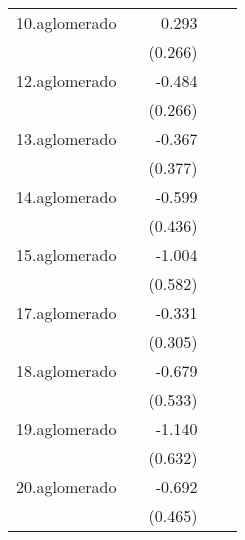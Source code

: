 {\begin{longtable}{l*{4}{D{.}{.}{-1}}}
\addlinespace
10.aglomerado&                     &       0.293         &                     &                     \\
            &                     &     (0.266)         &                     &                     \\
\addlinespace
12.aglomerado&                     &      -0.484         &                     &                     \\
            &                     &     (0.266)         &                     &                     \\
\addlinespace
13.aglomerado&                     &      -0.367         &                     &                     \\
            &                     &     (0.377)         &                     &                     \\
\addlinespace
14.aglomerado&                     &      -0.599         &                     &                     \\
            &                     &     (0.436)         &                     &                     \\
\addlinespace
15.aglomerado&                     &      -1.004         &                     &                     \\
            &                     &     (0.582)         &                     &                     \\
\addlinespace
17.aglomerado&                     &      -0.331         &                     &                     \\
            &                     &     (0.305)         &                     &                     \\
\addlinespace
18.aglomerado&                     &      -0.679         &                     &                     \\
            &                     &     (0.533)         &                     &                     \\
\addlinespace
19.aglomerado&                     &      -1.140         &                     &                     \\
            &                     &     (0.632)         &                     &                     \\
\addlinespace
20.aglomerado&                     &      -0.692         &                     &                     \\
            &                     &     (0.465)         &                     &                     \\

\end{longtable}}
